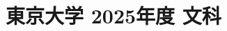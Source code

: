 ﻿\documentclass[../../uem_mat_tok_q.tex]{subfiles}
\begin{document}
    \section{東京大学 2025年度 文科}
    \subsection{　}
    
    \vfill
    \subsection{　}
    
    \vfill
    \newpage
    \subsection{　}
    
    \vfill
    \subsection{　}
    
    \vfill
\end{document}
